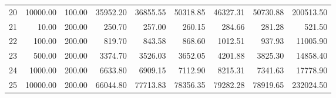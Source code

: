 \begin{table}[ht]
\begin{tabular}{rrrrrrrrr}
  20 & 10000.00 & 100.00 & 35952.20 & 36855.55 & 50318.85 & 46327.31 & 50730.88 & 200513.50 \\ 
  21 & 10.00 & 200.00 & 250.70 & 257.00 & 260.15 & 284.66 & 281.28 & 521.50 \\ 
  22 & 100.00 & 200.00 & 819.70 & 843.58 & 868.60 & 1012.51 & 937.93 & 11005.90 \\ 
  23 & 500.00 & 200.00 & 3374.70 & 3526.03 & 3652.05 & 4201.88 & 3825.30 & 14858.40 \\ 
  24 & 1000.00 & 200.00 & 6633.80 & 6909.15 & 7112.90 & 8215.31 & 7341.63 & 17778.90 \\ 
  25 & 10000.00 & 200.00 & 66044.80 & 77713.83 & 78356.35 & 79282.28 & 78919.65 & 232024.50 \\ 
   \hline
\end{tabular}
\end{table}
